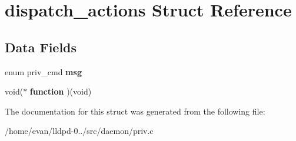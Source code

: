 \section{dispatch\-\_\-actions \-Struct \-Reference}
\label{structdispatch__actions}
\subsection*{\-Data \-Fields}
\begin{DoxyCompactItemize}
\item 
enum priv\-\_\-cmd {\bfseries msg}\label{structdispatch__actions_a8f33d40750c3f709856219956faddc3d}

\item 
void($\ast$ {\bfseries function} )(void)\label{structdispatch__actions_a0bd084ac2d6295338fa17d35371990b9}

\end{DoxyCompactItemize}


\-The documentation for this struct was generated from the following file\-:\begin{DoxyCompactItemize}
\item 
/home/evan/lldpd-\/0../src/daemon/priv.\-c\end{DoxyCompactItemize}
